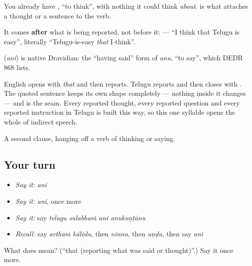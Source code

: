 You already have \textbf{}, \textquotedblleft{}to think\textquotedblright{}, with nothing it could think \emph{about}.  is what attaches a thought or a sentence to the verb.

It comes \textbf{after} what is being reported, not before it: \textbf{   } — \textquotedblleft{}I think that Telugu is easy\textquotedblright{}, literally \textquotedblleft{}Telugu-is-easy \emph{that} I-think\textquotedblright{}.

\begin{cousinweb}
\textbf{} (\emph{ani}) is native Dravidian: the \textquotedblleft{}having said\textquotedblright{} form of \emph{anu}, \textquotedblleft{}to say\textquotedblright{}, which DEDR 868 lists.
\end{cousinweb}

\begin{grammarlens}[title={Grammar Lens: Telugu quotes forwards, not backwards}]
English opens with \emph{that} and then reports. Telugu reports and then closes with . The quoted sentence keeps its own shape completely — nothing inside it changes — and  is the seam. Every reported thought, every reported question and every reported instruction in Telugu is built this way, so this one syllable opens the whole of indirect speech.
\end{grammarlens}

\begin{grammarlens}[title={What you've built}]
A second clause, hanging off a verb of thinking or saying.
\end{grammarlens}

\subsection*{Your turn}
\begin{itemize}
\raggedright
  \item \emph{Say it:} \emph{ani}
  \item \emph{Say it:} \emph{ani}, once more
  \item \emph{Say it:} say \emph{telugu sulabhaṁ ani anukuṇṭānu}
  \item \emph{Recall:} say \emph{arthaṁ kālēdu}, then \emph{ninna}, then \emph{uṇḍu}, then say \emph{ani}
\end{itemize}

\begin{tcolorbox}[breakable,colback=teal!4,colframe=teal!35!black,title={Before you move on}]
What does  mean? (\textquotedblleft{}that (reporting what was said or thought)\textquotedblright{}.) Say it once more.
\end{tcolorbox}
